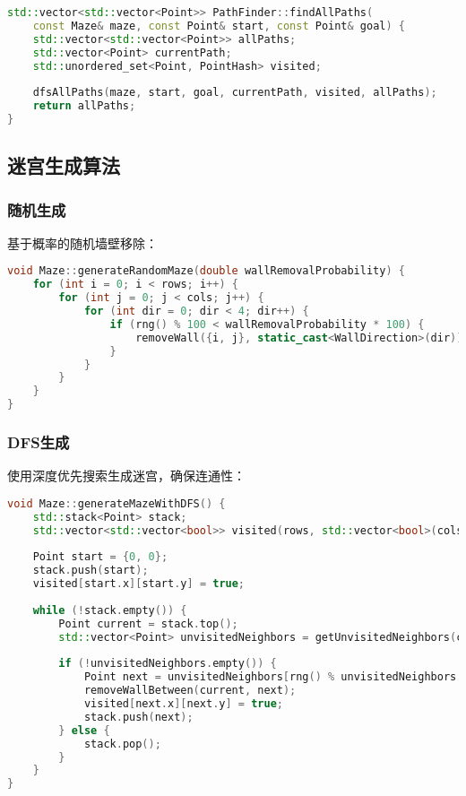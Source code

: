 \documentclass[UTF8]{ctexart}
\begin{document}
\begin{lstlisting}[language=C++]
std::vector<std::vector<Point>> PathFinder::findAllPaths(
    const Maze& maze, const Point& start, const Point& goal) {
    std::vector<std::vector<Point>> allPaths;
    std::vector<Point> currentPath;
    std::unordered_set<Point, PointHash> visited;
    
    dfsAllPaths(maze, start, goal, currentPath, visited, allPaths);
    return allPaths;
}
\end{lstlisting}

\subsection{迷宫生成算法}

\subsubsection{随机生成}
基于概率的随机墙壁移除：
\begin{lstlisting}[language=C++]
void Maze::generateRandomMaze(double wallRemovalProbability) {
    for (int i = 0; i < rows; i++) {
        for (int j = 0; j < cols; j++) {
            for (int dir = 0; dir < 4; dir++) {
                if (rng() % 100 < wallRemovalProbability * 100) {
                    removeWall({i, j}, static_cast<WallDirection>(dir));
                }
            }
        }
    }
}
\end{lstlisting}

\subsubsection{DFS生成}
使用深度优先搜索生成迷宫，确保连通性：
\begin{lstlisting}[language=C++]
void Maze::generateMazeWithDFS() {
    std::stack<Point> stack;
    std::vector<std::vector<bool>> visited(rows, std::vector<bool>(cols, false));
    
    Point start = {0, 0};
    stack.push(start);
    visited[start.x][start.y] = true;
    
    while (!stack.empty()) {
        Point current = stack.top();
        std::vector<Point> unvisitedNeighbors = getUnvisitedNeighbors(current, visited);
        
        if (!unvisitedNeighbors.empty()) {
            Point next = unvisitedNeighbors[rng() % unvisitedNeighbors.size()];
            removeWallBetween(current, next);
            visited[next.x][next.y] = true;
            stack.push(next);
        } else {
            stack.pop();
        }
    }
}
\end{lstlisting}
\end{document}
